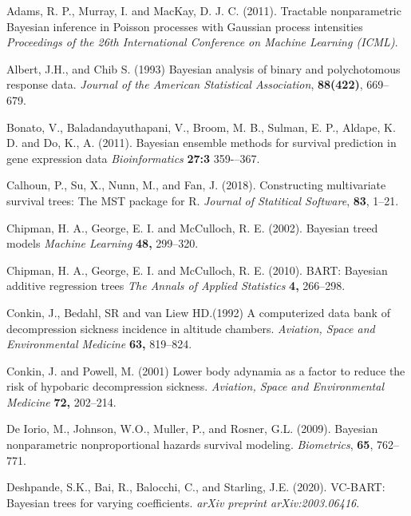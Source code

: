 \documentclass[11pt]{article}
\begin{document}
\begin{thebibliography}{}
\bibitem{ } Adams, R. P., Murray, I. and MacKay, D. J. C. (2011). Tractable nonparametric Bayesian inference in Poisson processes with Gaussian process intensities \textit{ Proceedings of the 26th International Conference on Machine Learning (ICML)}.

\bibitem{ } Albert, J.H., and Chib S. (1993) Bayesian analysis of binary and polychotomous response data. \textit{Journal of the American Statistical Association}, \textbf{88(422)}, 669--679.

\bibitem{ } Bonato, V., Baladandayuthapani, V., Broom, M. B., Sulman, E. P., Aldape, K. D. and Do, K., A. (2011). Bayesian ensemble methods for survival prediction in gene expression data \textit{Bioinformatics} \textbf{27:3} 359-–367.


\bibitem{ } Calhoun, P., Su, X., Nunn, M., and Fan, J. (2018). Constructing multivariate survival trees: The MST package for R. \textit{Journal of Statitical Software}, \textbf{83}, 1--21.

\bibitem{ } Chipman, H. A., George, E. I. and McCulloch, R. E. (2002). Bayesian treed models \textit{Machine Learning} \textbf{48,} 299--320.

\bibitem{ } Chipman, H. A., George, E. I. and McCulloch, R. E. (2010). BART: Bayesian additive regression trees \textit{The Annals of Applied Statistics} \textbf{4,} 266--298.

\bibitem{ }Conkin, J., Bedahl, SR and van Liew HD.(1992) A computerized data bank of decompression sickness incidence in altitude chambers.  \textit{Aviation, Space and Environmental Medicine} \textbf{63,} 819--824.
	
\bibitem{ }  Conkin, J. and Powell, M. (2001) Lower body adynamia as a factor to reduce the risk of hypobaric decompression
	sickness. \textit{Aviation, Space and Environmental Medicine} \textbf{72,} 202--214.

\bibitem{ } De Iorio, M., Johnson, W.O., Muller, P., and Rosner, G.L. (2009). Bayesian nonparametric
nonproportional hazards survival modeling. \textit{Biometrics}, \textbf{65}, 762--771.

\bibitem{ } Deshpande, S.K., Bai, R., Balocchi, C., and Starling, J.E. (2020). VC-BART: Bayesian trees for varying coefficients. \textit{arXiv preprint arXiv:2003.06416}.
	

\end{thebibliography}
\end{document}
